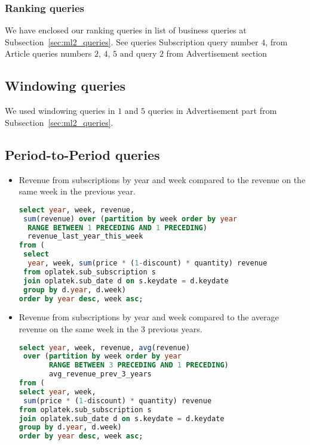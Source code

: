 \subsubsection{Ranking queries} %
\label{sub:ranking}
We have enclosed our ranking queries in list of business queries at Subsection~\ref{sec:ml2_queries}.
See queries Subscription query number $4$, from Article queries numbers $2$, $4$, $5$
and query $2$ from Advertisement section

\subsection{Windowing queries} 
\label{sub:windowing}
We used windowing queries in $1$ and $5$ queries in Advertisement part from Subsection~\ref{sec:ml2_queries}.

\subsection{Period-to-Period queries} %
\label{sub:period2period}
\begin{itemize}
    \item Revenue from subscriptions by year and week compared to the revenue on the same week in the previous year.
\begin{lstlisting}[language=sql] 
select year, week, revenue, 
 sum(revenue) over (partition by week order by year 
  RANGE BETWEEN 1 PRECEDING AND 1 PRECEDING) 
  revenue_last_year_this_week        
from (
 select 
  year, week, sum(price * (1-discount) * quantity) revenue 
 from oplatek.sub_subscription s 
 join oplatek.sub_date d on s.keydate = d.keydate 
 group by d.year, d.week)
order by year desc, week asc;
\end{lstlisting}

\item Revenue from subscriptions by year and week compared to the average revenue on the same week in the 3 previous years.
\begin{lstlisting}[language=sql] 
select year, week, revenue, avg(revenue) 
 over (partition by week order by year 
       RANGE BETWEEN 3 PRECEDING AND 1 PRECEDING) 
       avg_revenue_prev_3_years        
from (
select year, week, 
 sum(price * (1-discount) * quantity) revenue 
from oplatek.sub_subscription s 
join oplatek.sub_date d on s.keydate = d.keydate
group by d.year, d.week)
order by year desc, week asc;
\end{lstlisting}

\end{itemize}

